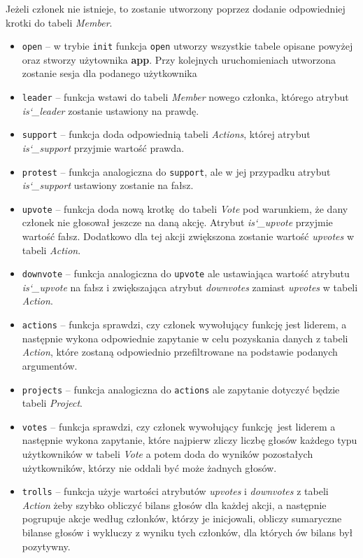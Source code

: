 \documentclass[12pt]{article}
\begin{document}
Jeżeli członek nie istnieje, to zostanie utworzony poprzez dodanie odpowiedniej
krotki do tabeli \textit{Member}.

\begin{itemize}
    \item{\texttt{open} -- w trybie \texttt{init} funkcja \texttt{open} utworzy
          wszystkie tabele opisane powyżej oraz stworzy użytownika \textbf{app}.
          Przy kolejnych uruchomieniach utworzona zostanie sesja dla podanego
          użytkownika}
    \item{\texttt{leader} -- funkcja wstawi do tabeli \textit{Member} nowego
          członka, którego atrybut \textit{is\char`_leader} zostanie ustawiony
          na prawdę.}
    \item{\texttt{support} -- funkcja doda odpowiednią tabeli \textit{Actions},
          której atrybut \textit{is\char`_support} przyjmie wartość prawda.}
    \item{\texttt{protest} -- funkcja analogiczna do \texttt{support}, ale w jej
          przypadku atrybut \textit{is\char`_support} ustawiony zostanie na fałsz.}
    \item{\texttt{upvote} -- funkcja doda nową krotkę do tabeli \textit{Vote} pod warunkiem,
          że dany członek nie głosował jeszcze na daną akcję. Atrybut \textit{is\char`_upvote}
          przyjmie wartość fałsz. Dodatkowo dla tej akcji zwiększona zostanie
          wartość \textit{upvotes} w tabeli \textit{Action}}.
    \item{\texttt{downvote} -- funkcja analogiczna do \texttt{upvote} ale ustawiająca
          wartość atrybutu \textit{is\char`_upvote} na fałsz i zwiększająca atrybut
          \textit{downvotes} zamiast \textit{upvotes} w tabeli \textit{Action}}.
    \item{\texttt{actions} -- funkcja sprawdzi, czy członek wywołujący funkcję
          jest liderem, a następnie wykona odpowiednie zapytanie w celu pozyskania
          danych z tabeli \textit{Action}, które zostaną odpowiednio przefiltrowane
          na podstawie podanych argumentów.}
    \item{\texttt{projects} -- funkcja analogiczna do \texttt{actions} ale
          zapytanie dotyczyć będzie tabeli \textit{Project}.}
    \item{\texttt{votes} -- funkcja sprawdzi, czy członek wywołujący funkcję jest
          liderem a następnie wykona zapytanie, które najpierw zliczy liczbę
          głosów każdego typu użytkowników w tabeli \textit{Vote} a potem
          doda do wyników pozostałych użytkowników, którzy nie oddali być może 
          żadnych głosów.}
    \item{\texttt{trolls} -- funkcja użyje wartości atrybutów \textit{upvotes} i 
          \textit{downvotes} z tabeli \textit{Action} żeby szybko obliczyć bilans
          głosów dla każdej akcji, a następnie pogrupuje akcje według członków,
          którzy je inicjowali, obliczy sumaryczne bilanse głosów i wykluczy
          z wyniku tych członków, dla których ów bilans był pozytywny.}
\end{itemize}
\end{document}
